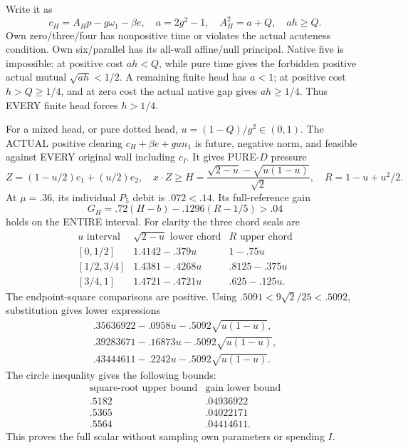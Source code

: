 \documentclass[11pt]{article}
\begin{document}
Write it as
\[
 c_H=A_Hp-g\omega_1-\beta e,\quad
 a=2g^2-1,\quad A_H^2=a+Q,\quad ah\ge Q .
\]
Own zero/three/four has nonpositive
time or violates the actual acuteness
condition.
Own six/parallel has its all-wall
affine/null principal.
Native five is impossible: at positive
cost \(ah<Q\), while pure time gives
the forbidden positive actual mutual
\(\sqrt{ah}<1/2\).
A remaining finite head has \(a<1\);
at positive cost \(h>Q\ge1/4\),
and at zero cost the actual native
gap gives \(ah\ge1/4\).
Thus EVERY finite head forces \(h>1/4\).

For a mixed head, or pure dotted head,
\(u=(1-Q)/g^2\in(0,1)\).
The ACTUAL positive clearing
\(c_H+\beta e+gu n_1\) is future,
negative norm, and feasible against
EVERY original wall including \(c_I\).
It gives PURE-\(D\) pressure
\[
 Z=(1-u/2)e_1+(u/2)e_2,\quad
 x\cdot Z\ge H={\frac{\sqrt{2-u}-\sqrt{u(1-u)}}{\sqrt2}},
 \quad R=1-u+u^2/2 .
\]
At \(\mu=.36\), its individual
\(P_5\) debit is \(.072<.14\).
Its full-reference gain
\[
                     G_H=.72(H-b)-.1296(R-1/5)>.04
\tag{D16IH}\label{eq:arithD16Iheadgain}
\]
holds on the ENTIRE interval.
For clarity the three chord seals are
\[
\begin{array}{c|c|c}
 u\text{ interval}&\sqrt{2-u}\text{ lower chord}&R\text{ upper chord}\\ \hline
 {}[0,1/2]&1.4142-.379u&1-.75u\\
 {}[1/2,3/4]&1.4381-.4268u&.8125-.375u\\
 {}[3/4,1]&1.4721-.4721u&.625-.125u .
\end{array}
\]
The endpoint-square comparisons are positive.
Using \(.5091<9\sqrt2/25<.5092\),
substitution gives lower expressions
\[
\begin{gathered}
 .35636922-.0958u-.5092\sqrt{u(1-u)},\\
 .39283671-.16873u-.5092\sqrt{u(1-u)},\\
 .43444611-.2242u-.5092\sqrt{u(1-u)} .
\end{gathered}
\]
The circle inequality gives the following bounds:
\[
\begin{array}{c|c}
\text{square-root upper bound}&\text{gain lower bound}\\\hline
.5182&.04936922\\
.5365&.04022171\\
.5564&.04414611.
\end{array}
\]
This proves the full scalar without
sampling own parameters or spending \(I\).
\end{document}
